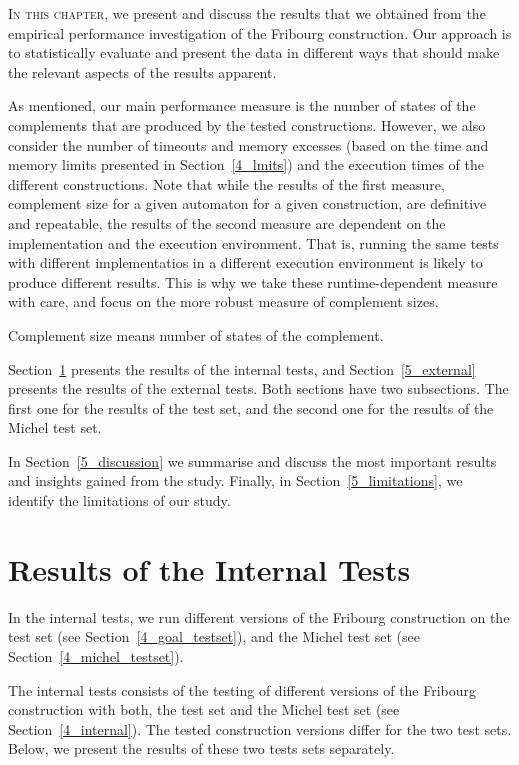 \lettrine{I}{n this chapter}, we present and discuss the results that we obtained from the empirical performance investigation of the Fribourg construction. Our approach is to statistically evaluate and present the data in different ways that should make the relevant aspects of the results apparent. 

As mentioned, our main performance measure is the number of states of the complements that are produced by the tested constructions. However, we also consider the number of timeouts and memory excesses (based on the time and memory limits presented in Section~\ref{4_lmits}) and the execution times of the different constructions. Note that while the results of the first measure, complement size for a given automaton for a given construction, are definitive and repeatable, the results of the second measure are dependent on the implementation and the execution environment. That is, running the same tests with different implementatios in a different execution environment is likely to produce different results. This is why we take these runtime-dependent measure with care, and focus on the more robust measure of complement sizes.

Complement size means number of states of the complement.


Section~\ref{5_internal} presents the results of the internal tests, and Section~\ref{5_external} presents the results of the external tests. Both sections have two subsections. The first one for the results of the \goal{} test set, and the second one for the results of the Michel test set.

In Section~\ref{5_discussion} we summarise and discuss the most important results and insights gained from the study. Finally, in Section~\ref{5_limitations}, we identify the limitations of our study.


\section{Results of the Internal Tests}
\label{5_internal}
In the internal tests, we run different versions of the Fribourg construction on the \goal{} test set (see Section~\ref{4_goal_testset}), and the Michel test set (see Section~\ref{4_michel_testset}). 


The internal tests consists of the testing of different versions of the Fribourg construction with both, the \goal{} test set and the Michel test set (see Section~\ref{4_internal}). The tested construction versions differ for the two test sets. Below, we present the results of these two tests sets separately.

